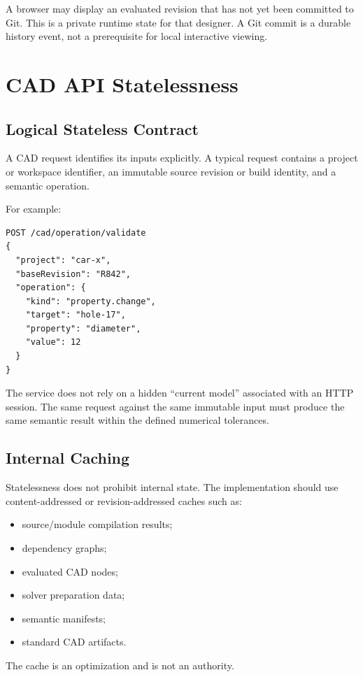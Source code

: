 \documentclass[11pt,a4paper]{article}
\begin{document}
A browser may display an evaluated revision that has not yet been committed to Git. This is a private runtime state for that designer. A Git commit is a durable history event, not a prerequisite for local interactive viewing.

\section{CAD API Statelessness}

\subsection{Logical Stateless Contract}

A CAD request identifies its inputs explicitly. A typical request contains a project or workspace identifier, an immutable source revision or build identity, and a semantic operation.

For example:

\begin{verbatim}
POST /cad/operation/validate
{
  "project": "car-x",
  "baseRevision": "R842",
  "operation": {
    "kind": "property.change",
    "target": "hole-17",
    "property": "diameter",
    "value": 12
  }
}
\end{verbatim}

The service does not rely on a hidden ``current model'' associated with an HTTP session. The same request against the same immutable input must produce the same semantic result within the defined numerical tolerances.

\subsection{Internal Caching}

Statelessness does not prohibit internal state. The implementation should use content-addressed or revision-addressed caches such as:
\begin{itemize}
    \item source/module compilation results;
    \item dependency graphs;
    \item evaluated CAD nodes;
    \item solver preparation data;
    \item semantic manifests;
    \item standard CAD artifacts.
\end{itemize}

The cache is an optimization and is not an authority.
\end{document}
